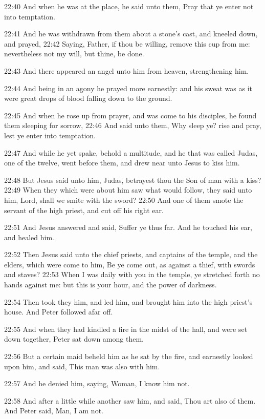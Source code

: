 22:40 And when he was at the place, he said unto them, Pray that ye
enter not into temptation.

22:41 And he was withdrawn from them about a stone's cast, and kneeled
down, and prayed, 22:42 Saying, Father, if thou be willing, remove
this cup from me: nevertheless not my will, but thine, be done.

22:43 And there appeared an angel unto him from heaven, strengthening
him.

22:44 And being in an agony he prayed more earnestly: and his sweat
was as it were great drops of blood falling down to the ground.

22:45 And when he rose up from prayer, and was come to his disciples,
he found them sleeping for sorrow, 22:46 And said unto them, Why sleep
ye? rise and pray, lest ye enter into temptation.

22:47 And while he yet spake, behold a multitude, and he that was
called Judas, one of the twelve, went before them, and drew near unto
Jesus to kiss him.

22:48 But Jesus said unto him, Judas, betrayest thou the Son of man
with a kiss?  22:49 When they which were about him saw what would
follow, they said unto him, Lord, shall we smite with the sword?
22:50 And one of them smote the servant of the high priest, and cut
off his right ear.

22:51 And Jesus answered and said, Suffer ye thus far. And he touched
his ear, and healed him.

22:52 Then Jesus said unto the chief priests, and captains of the
temple, and the elders, which were come to him, Be ye come out, as
against a thief, with swords and staves?  22:53 When I was daily with
you in the temple, ye stretched forth no hands against me: but this is
your hour, and the power of darkness.

22:54 Then took they him, and led him, and brought him into the high
priest's house. And Peter followed afar off.

22:55 And when they had kindled a fire in the midst of the hall, and
were set down together, Peter sat down among them.

22:56 But a certain maid beheld him as he sat by the fire, and
earnestly looked upon him, and said, This man was also with him.

22:57 And he denied him, saying, Woman, I know him not.

22:58 And after a little while another saw him, and said, Thou art
also of them. And Peter said, Man, I am not.

